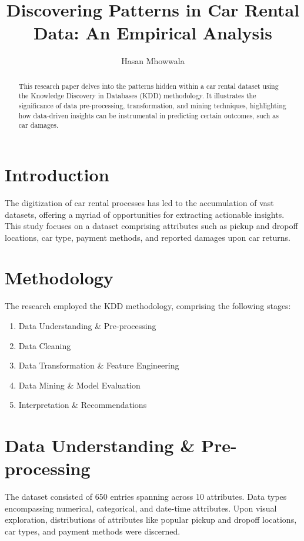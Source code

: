 \documentclass{article}
\title{Discovering Patterns in Car Rental Data: An Empirical Analysis}
\author[1]{Hasan Mhowwala}
\affil[1]{San Jose State University}
\begin{document}
\maketitle

\begin{abstract}
This research paper delves into the patterns hidden within a car rental dataset using the Knowledge Discovery in Databases (KDD) methodology. It illustrates the significance of data pre-processing, transformation, and mining techniques, highlighting how data-driven insights can be instrumental in predicting certain outcomes, such as car damages.
\end{abstract}

\section{Introduction}
The digitization of car rental processes has led to the accumulation of vast datasets, offering a myriad of opportunities for extracting actionable insights. This study focuses on a dataset comprising attributes such as pickup and dropoff locations, car type, payment methods, and reported damages upon car returns.

\section{Methodology}
The research employed the KDD methodology, comprising the following stages:
\begin{enumerate}
    \item Data Understanding \& Pre-processing
    \item Data Cleaning
    \item Data Transformation \& Feature Engineering
    \item Data Mining \& Model Evaluation
    \item Interpretation \& Recommendations
\end{enumerate}

\section{Data Understanding \& Pre-processing}
The dataset consisted of 650 entries spanning across 10 attributes. Data types encompassing numerical, categorical, and date-time attributes. Upon visual exploration, distributions of attributes like popular pickup and dropoff locations, car types, and payment methods were discerned.
\end{document}
